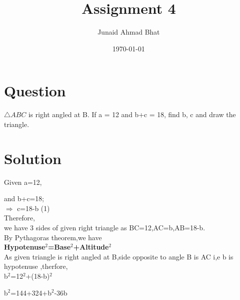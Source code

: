 \documentclass[a4paper,12pt]{article}
\begin{document}
\title{Assignment 4}
\author{Junaid Ahmad Bhat}
\date{\today}
\maketitle
\section*{\small Question}

$\triangle  ABC$ is right angled at B. If a = 12 and b+c =
18, find b, c and draw the triangle.

\section*{\small Solution}

Given \hspace*{3.8cm} a=12,\\

\vspace*{1mm}

and  \hspace*{3cm}  b+c=18;\\

$\Rightarrow$  \hspace*{3.5cm} c=18-b    \hspace*{1.5cm}(1)\\

Therefore,\\
\hspace*{0.5cm} we have 3 sides of given right triangle as BC=12,AC=b,AB=18-b.\\

By Pythagoras theorem,we have\\

\textbf{Hypotenuse$^2$=Base$^2$+Altitude$^2$}\\

As given triangle is right angled at B,side opposite to angle B is AC i,e b is\\

hypotenuse ,therfore,\\


 \hspace*{3cm} b$^2$=12$^2$+(18-b)$^2$\\ 

\vspace*{0.3cm}

 \hspace*{3cm} b$^2$=144+324+b$^2$-36b\\
\end{document}
